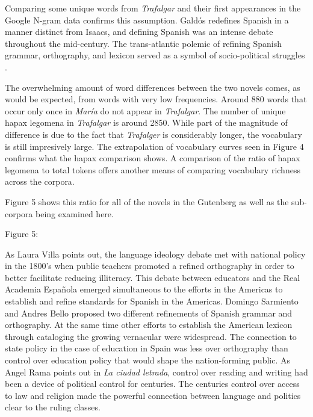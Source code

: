 \documentclass[12pt]{report}
\begin{document}
Comparing some unique words from \textit{Trafalgar} and their first appearances in the Google N-gram data confirms this assumption.
Galdós redefines Spanish in a manner distinct from Isaacs, and defining Spanish was an intense debate throughout the mid-century.
The trans-atlantic polemic of refining Spanish grammar, orthography, and lexicon served as a symbol of socio-political struggles \cite[230]{Villa2015}.

The overwhelming amount of word differences between the two novels comes, as would be expected, from words with very low frequencies.
Around 880 words that occur only once in \textit{María} do not appear in \textit{Trafalgar}.
The number of unique hapax legomena in \textit{Trafalgar} is around 2850.
While part of the magnitude of difference is due to the fact that \textit{Trafalger} is considerably longer, the vocabulary is still impresively large.
The extrapolation of vocabulary curves seen in Figure 4 confirms what the hapax comparison shows.
A comparison of the ratio of hapax legomena to total tokens offers another means of comparing vocabulary richness across the corpora.

Figure 5 shows this ratio for all of the novels in the Gutenberg as well as the sub-corpora being examined here.

Figure 5:




As Laura Villa points out, the language ideology debate met with national policy in the 1800's when public teachers promoted a refined orthography in order to better facilitate reducing illiteracy.
This debate between educators and the Real Academia Española emerged simultaneous to the efforts in the Americas to establish and refine standards for Spanish in the Americas.
Domingo Sarmiento and Andres Bello proposed two different refinements of Spanish grammar and orthography.
At the same time other efforts to establish the American lexicon through cataloging the growing vernacular were widespread. 
The connection to state policy in the case of education in Spain was less over orthography than control over education policy that would shape the nation-forming public.
As Angel Rama points out in \textit{La ciudad letrada}, control over reading and writing had been a device of political control for centuries.
The centuries control over access to law and religion made the powerful connection between language and politics clear to the ruling classes.
\end{document}
